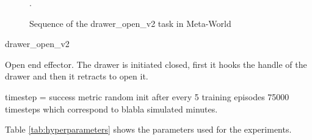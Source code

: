  \begin{figure}[H]
  \centering
  \hspace*{\fill}%
   \hfill
   \hfill
  \hspace*{\fill}%
  \caption{Sequence of the drawer\_open\_v2 task in Meta-World}.
\end{figure}


drawer\_open\_v2

Open end effector. The drawer is initiated closed, first it hooks the handle of the drawer and then it retracts to open it.

timestep = 
success metric
random init
after every 5 training episodes
75000 timesteps which correspond to blabla simulated minutes.

Table \ref{tab:hyperparameters} shows the parameters used for the experiments.




